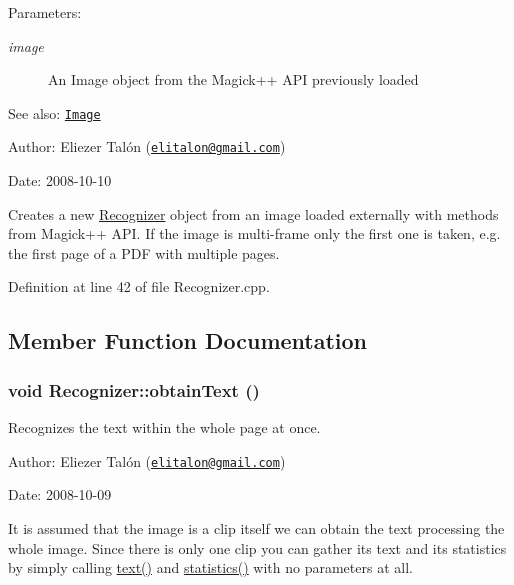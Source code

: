 \begin{Desc}
\item[Parameters:]
\begin{description}
\item[{\em image}]An Image object from the Magick++ API previously loaded\end{description}
\end{Desc}
\begin{Desc}
\item[See also:]\href{http://www.imagemagick.org/Magick++/Image.html}{\tt Image}\end{Desc}
\begin{Desc}
\item[Author:]Eliezer Talón (\href{mailto:elitalon@gmail.com}{\tt elitalon@gmail.com}) \end{Desc}
\begin{Desc}
\item[Date:]2008-10-10\end{Desc}
Creates a new \hyperlink{class_recognizer}{Recognizer} object from an image loaded externally with methods from Magick++ API. If the image is multi-frame only the first one is taken, e.g. the first page of a PDF with multiple pages. 

Definition at line 42 of file Recognizer.cpp.

\subsection{Member Function Documentation}
\hypertarget{class_recognizer_008a0ea69a912ff54882dd20d18adcf9}{
\subsubsection[obtainText]{\setlength{\rightskip}{0pt plus 5cm}void Recognizer::obtainText ()}}
\label{class_recognizer_008a0ea69a912ff54882dd20d18adcf9}


Recognizes the text within the whole page at once. 

\begin{Desc}
\item[Author:]Eliezer Talón (\href{mailto:elitalon@gmail.com}{\tt elitalon@gmail.com}) \end{Desc}
\begin{Desc}
\item[Date:]2008-10-09\end{Desc}
It is assumed that the image is a clip itself we can obtain the text processing the whole image. Since there is only one clip you can gather its text and its statistics by simply calling \hyperlink{class_recognizer_c5d20b511888a60a6c1a81c0a4206ec2}{text()} and \hyperlink{class_recognizer_8b38356d2741969e67cd6b4f507897ba}{statistics()} with no parameters at all. 

